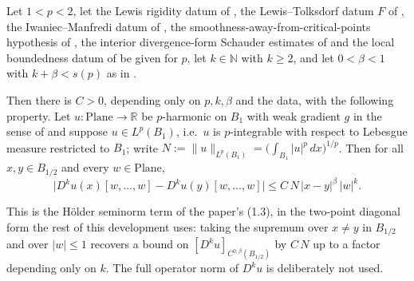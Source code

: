 \begin{lemma}
Let $1<p<2$, let the Lewis rigidity datum of , the Lewis--Tolksdorf
datum $F$ of , the Iwaniec--Manfredi datum of
, the smoothness-away-from-critical-points hypothesis of
, the interior divergence-form Schauder estimates of
 and the local boundedness datum of
 be given for $p$, let $k\in\mathbb{N}$ with $k\ge2$, and let
$0<\beta<1$ with $k+\beta<s(p)$ as in .

Then there is $C>0$, depending only on $p,k,\beta$ and the data, with the following property.
Let $u\colon\mathrm{Plane}\to\mathbb{R}$ be $p$-harmonic on $B_1$ with weak gradient $g$ in the
sense of  and suppose $u\in L^{p}(B_1)$, i.e.\ $u$ is $p$-integrable with
respect to Lebesgue measure restricted to $B_1$; write
$N:=\lVert u\rVert_{L^{p}(B_1)}=\bigl(\int_{B_1}\lvert u\rvert^{p}\,dx\bigr)^{1/p}$.  Then for all $x,y\in B_{1/2}$ and every
$w\in\mathrm{Plane}$,
\[
  \bigl\lvert D^{k}u(x)[w,\ldots,w]-D^{k}u(y)[w,\ldots,w]\bigr\rvert
  \le C\,N\,\lvert x-y\rvert^{\beta}\,\lvert w\rvert^{k}.
\]

This is the H\"older seminorm term of the paper's (1.3), in the two-point diagonal form the
rest of this development uses: taking the supremum over $x\ne y$ in $B_{1/2}$ and over
$\lvert w\rvert\le1$ recovers a bound on $[D^{k}u]_{C^{0,\beta}(B_{1/2})}$ by $C\,N$ up to a
factor depending only on $k$.  The full operator norm of $D^{k}u$ is deliberately not used.
\end{lemma}
